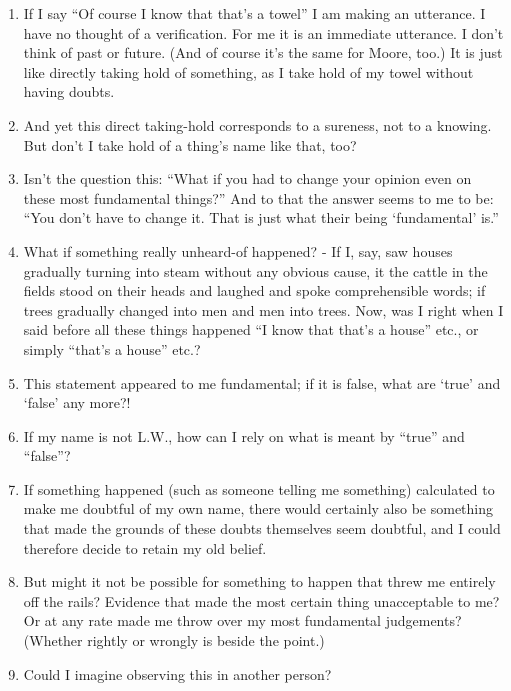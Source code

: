 \documentclass{book}
\begin{document}
\begin{enumerate}
\item
If I say ``Of course I know that that's a towel'' I am making an utterance. I
have no thought of a verification. For me it is an immediate utterance.  I
don't think of past or future. (And of course it's the same for Moore, too.) It
is just like directly taking hold of something, as I take hold of my towel
without having doubts.

\item
And yet this direct taking-hold corresponds to a sureness, not to a knowing.
But don't I take hold of a thing's name like that, too?

\item
Isn't the question this: ``What if you had to change your opinion even on these
most fundamental things?'' And to that the answer seems to me to be: ``You
don't have to change it. That is just what their being `fundamental' is.''

\item
What if something really unheard-of happened? - If I, say, saw houses gradually
turning into steam without any obvious cause, it the cattle in the fields stood
on their heads and laughed and spoke comprehensible words; if trees gradually
changed into men and men into trees. Now, was I right when I said before all
these things happened ``I know that that's a house'' etc., or simply ``that's a
house'' etc.?

\item
This statement appeared to me fundamental; if it is false, what are `true' and
`false' any more?!

\item
If my name is not L.W., how can I rely on what is meant by ``true'' and
``false''?

\item
If something happened (such as someone telling me something) calculated to make
me doubtful of my own name, there would certainly also be something that made
the grounds of these doubts themselves seem doubtful, and I could therefore
decide to retain my old belief.

\item
But might it not be possible for something to happen that threw me entirely off
the rails? Evidence that made the most certain thing unacceptable to me? Or at
any rate made me throw over my most fundamental judgements? (Whether rightly or
wrongly is beside the point.)

\item
Could I imagine observing this in another person?


\end{enumerate}
\end{document}
